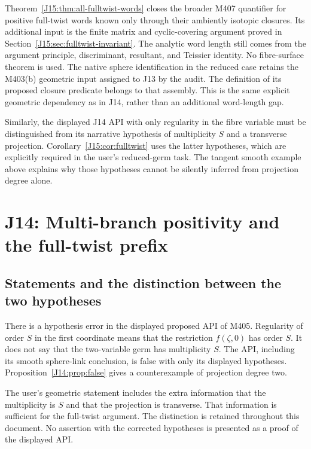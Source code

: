 \documentclass[11pt,oneside]{report}
\theoremstyle{definition}
\numberwithin{equation}{section}
\begin{document}
Theorem~\ref{J15:thm:all-fulltwist-words} closes the broader M407 quantifier
for positive full-twist words known only through their ambiently isotopic
closures. Its additional input is the finite matrix and cyclic-covering
argument proved in Section~\ref{J15:sec:fulltwist-invariant}. The analytic
word length still comes from the argument principle, discriminant,
resultant, and Teissier identity. No fibre-surface theorem is used.
The native sphere identification in the reduced case retains the
M403(b) geometric input assigned to J13 by the audit. The definition of
its proposed closure predicate belongs to that assembly. This is the
same explicit geometric dependency as in J14, rather than an additional
word-length gap.

Similarly, the displayed J14 API with only regularity in the fibre variable
must be distinguished from its narrative hypothesis of multiplicity $S$
and a transverse projection. Corollary~\ref{J15:cor:fulltwist} uses the latter
hypotheses, which are explicitly required in the user's reduced-germ task.
The tangent smooth example above explains why those hypotheses cannot be
silently inferred from projection degree alone.




\chapter{J14: Multi-branch positivity and the full-twist prefix}
\label{chapter:J14}



\section{Statements and the distinction between the two hypotheses}

There is a hypothesis error in the displayed proposed API of M405.
Regularity of order $S$ in the first coordinate means that the restriction
$f(\zeta,0)$ has order $S$. It does not say that the two-variable germ has
multiplicity $S$. The API, including its smooth sphere-link conclusion, is
false with only its displayed hypotheses. Proposition~\ref{J14:prop:false}
gives a counterexample of projection degree two.

The user's geometric statement includes the extra information that the
multiplicity is $S$ and that the projection is transverse. That information
is sufficient for the full-twist argument. The distinction is retained
throughout this document. No assertion with the corrected hypotheses is
presented as a proof of the displayed API.
\end{document}
